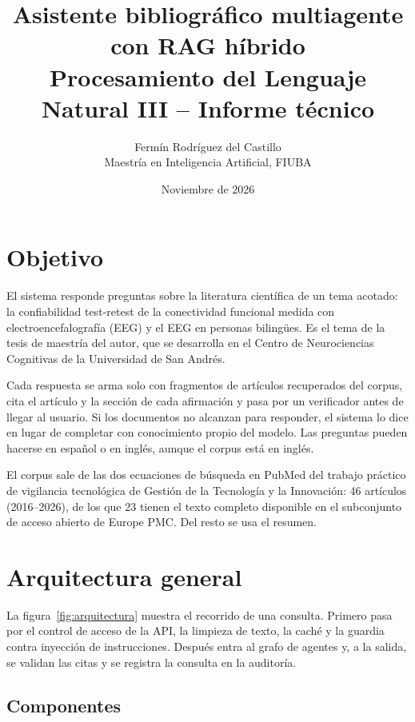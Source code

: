 \documentclass[11pt,a4paper]{article}
\title{Asistente bibliográfico multiagente con RAG híbrido\\[2pt]
\large Procesamiento del Lenguaje Natural III -- Informe técnico}
\author{Fermín Rodríguez del Castillo\\Maestría en Inteligencia Artificial, FIUBA}
\date{Noviembre de 2026}
\begin{document}
\maketitle

\section{Objetivo}

El sistema responde preguntas sobre la literatura científica de un tema acotado: la confiabilidad
test-retest de la conectividad funcional medida con electroencefalografía (EEG) y el EEG en personas
bilingües. Es el tema de la tesis de maestría del autor, que se desarrolla en el Centro de
Neurociencias Cognitivas de la Universidad de San Andrés.

Cada respuesta se arma solo con fragmentos de artículos recuperados del corpus, cita el artículo y la
sección de cada afirmación y pasa por un verificador antes de llegar al usuario. Si los documentos no
alcanzan para responder, el sistema lo dice en lugar de completar con conocimiento propio del modelo.
Las preguntas pueden hacerse en español o en inglés, aunque el corpus está en inglés.

El corpus sale de las dos ecuaciones de búsqueda en PubMed del trabajo práctico de vigilancia
tecnológica de Gestión de la Tecnología y la Innovación: 46 artículos (2016--2026), de los que 23
tienen el texto completo disponible en el subconjunto de acceso abierto de Europe PMC. Del resto se
usa el resumen.

\section{Arquitectura general}



La figura~\ref{fig:arquitectura} muestra el recorrido de una consulta. Primero pasa por el control de
acceso de la API, la limpieza de texto, la caché y la guardia contra inyección de instrucciones.
Después entra al grafo de agentes y, a la salida, se validan las citas y se registra la consulta en
la auditoría.

\subsection{Componentes}
\end{document}

